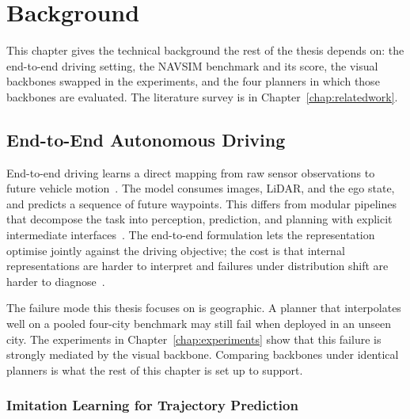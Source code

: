\chapter{Background}
\label{chap:background}

This chapter gives the technical background the rest of the thesis depends on: the end-to-end driving setting, the NAVSIM benchmark and its score, the visual backbones swapped in the experiments, and the four planners in which those backbones are evaluated. The literature survey is in Chapter~\ref{chap:relatedwork}.

\section{End-to-End Autonomous Driving}
\label{sec:bg-e2e}

End-to-end driving learns a direct mapping from raw sensor observations to future vehicle motion~\cite{bojarski-pilotnet-2016,chen-e2e-survey-2024}. The model consumes images, LiDAR, and the ego state, and predicts a sequence of future waypoints. This differs from modular pipelines that decompose the task into perception, prediction, and planning with explicit intermediate interfaces~\cite{caesar-nuscenes-2020,karnchanachari-nuplan-2024,hu-uniad-2023,jiang-vad-2023}. The end-to-end formulation lets the representation optimise jointly against the driving objective; the cost is that internal representations are harder to interpret and failures under distribution shift are harder to diagnose~\cite{codevilla-limitations-2019,zhai-rethinking-2023}.

The failure mode this thesis focuses on is geographic. A planner that interpolates well on a pooled four-city benchmark may still fail when deployed in an unseen city. The experiments in Chapter~\ref{chap:experiments} show that this failure is strongly mediated by the visual backbone. Comparing backbones under identical planners is what the rest of this chapter is set up to support.

\subsection{Imitation Learning for Trajectory Prediction}
\label{sec:bg-il}

